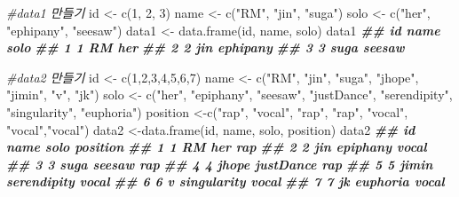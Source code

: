 \documentclass[
]{book}
\newenvironment{Shaded}{\begin{snugshade}}{\end{snugshade}}
\newcommand{\CommentTok}[1]{\textcolor[rgb]{0.56,0.35,0.01}{\textit{#1}}}
\newcommand{\DecValTok}[1]{\textcolor[rgb]{0.00,0.00,0.81}{#1}}
\newcommand{\DocumentationTok}[1]{\textcolor[rgb]{0.56,0.35,0.01}{\textbf{\textit{#1}}}}
\newcommand{\FunctionTok}[1]{\textcolor[rgb]{0.00,0.00,0.00}{#1}}
\newcommand{\NormalTok}[1]{#1}
\newcommand{\OtherTok}[1]{\textcolor[rgb]{0.56,0.35,0.01}{#1}}
\newcommand{\StringTok}[1]{\textcolor[rgb]{0.31,0.60,0.02}{#1}}
\theoremstyle{definition}
\theoremstyle{definition}
\theoremstyle{definition}
\theoremstyle{definition}
\theoremstyle{remark}
\begin{document}
\begin{Shaded}
\begin{Highlighting}[]
\CommentTok{\#data1 만들기 }
\NormalTok{id }\OtherTok{\textless{}{-}} \FunctionTok{c}\NormalTok{(}\DecValTok{1}\NormalTok{, }\DecValTok{2}\NormalTok{, }\DecValTok{3}\NormalTok{)}
\NormalTok{name }\OtherTok{\textless{}{-}} \FunctionTok{c}\NormalTok{(}\StringTok{"RM"}\NormalTok{, }\StringTok{"jin"}\NormalTok{, }\StringTok{"suga"}\NormalTok{)}
\NormalTok{solo }\OtherTok{\textless{}{-}} \FunctionTok{c}\NormalTok{(}\StringTok{"her"}\NormalTok{, }\StringTok{"ephipany"}\NormalTok{, }\StringTok{"seesaw"}\NormalTok{)}
\NormalTok{data1 }\OtherTok{\textless{}{-}} \FunctionTok{data.frame}\NormalTok{(id, name, solo)}
\NormalTok{data1}
\DocumentationTok{\#\#   id name     solo}
\DocumentationTok{\#\# 1  1   RM      her}
\DocumentationTok{\#\# 2  2  jin ephipany}
\DocumentationTok{\#\# 3  3 suga   seesaw}

\CommentTok{\#data2 만들기}
\NormalTok{id }\OtherTok{\textless{}{-}} \FunctionTok{c}\NormalTok{(}\DecValTok{1}\NormalTok{,}\DecValTok{2}\NormalTok{,}\DecValTok{3}\NormalTok{,}\DecValTok{4}\NormalTok{,}\DecValTok{5}\NormalTok{,}\DecValTok{6}\NormalTok{,}\DecValTok{7}\NormalTok{)}
\NormalTok{name }\OtherTok{\textless{}{-}} \FunctionTok{c}\NormalTok{(}\StringTok{"RM"}\NormalTok{, }\StringTok{"jin"}\NormalTok{, }\StringTok{"suga"}\NormalTok{, }\StringTok{"jhope"}\NormalTok{, }\StringTok{"jimin"}\NormalTok{, }\StringTok{"v"}\NormalTok{, }\StringTok{"jk"}\NormalTok{)}
\NormalTok{solo }\OtherTok{\textless{}{-}} \FunctionTok{c}\NormalTok{(}\StringTok{"her"}\NormalTok{, }\StringTok{"epiphany"}\NormalTok{, }\StringTok{"seesaw"}\NormalTok{, }\StringTok{"justDance"}\NormalTok{, }\StringTok{"serendipity"}\NormalTok{, }\StringTok{"singularity"}\NormalTok{, }\StringTok{"euphoria"}\NormalTok{)}
\NormalTok{position }\OtherTok{\textless{}{-}}\FunctionTok{c}\NormalTok{(}\StringTok{"rap"}\NormalTok{, }\StringTok{"vocal"}\NormalTok{, }\StringTok{"rap"}\NormalTok{, }\StringTok{"rap"}\NormalTok{, }\StringTok{"vocal"}\NormalTok{, }\StringTok{"vocal"}\NormalTok{,}\StringTok{"vocal"}\NormalTok{)}
\NormalTok{data2 }\OtherTok{\textless{}{-}}\FunctionTok{data.frame}\NormalTok{(id, name, solo, position)}
\NormalTok{data2}
\DocumentationTok{\#\#   id  name        solo position}
\DocumentationTok{\#\# 1  1    RM         her      rap}
\DocumentationTok{\#\# 2  2   jin    epiphany    vocal}
\DocumentationTok{\#\# 3  3  suga      seesaw      rap}
\DocumentationTok{\#\# 4  4 jhope   justDance      rap}
\DocumentationTok{\#\# 5  5 jimin serendipity    vocal}
\DocumentationTok{\#\# 6  6     v singularity    vocal}
\DocumentationTok{\#\# 7  7    jk    euphoria    vocal}


\end{Highlighting}
\end{Shaded}
\end{document}
